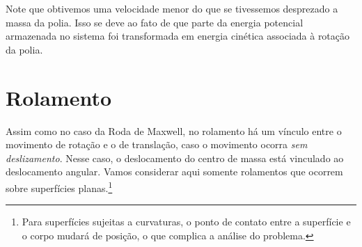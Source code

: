 Note que obtivemos uma velocidade menor do que se tivessemos desprezado a massa da polia. Isso se deve ao fato de que parte da energia potencial armazenada no sistema foi transformada em energia cinética associada à rotação da polia.


\section{Rolamento}

Assim como no caso da Roda de Maxwell, no rolamento há um vínculo entre o movimento de rotação e o de translação, caso o movimento ocorra \emph{sem deslizamento}. Nesse caso, o deslocamento do centro de massa está vinculado ao deslocamento angular. Vamos considerar aqui somente rolamentos que ocorrem sobre superfícies planas.\footnote[][-3cm]{Para superfícies sujeitas a curvaturas, o ponto de contato entre a superfície e o corpo mudará de posição, o que complica a análise do problema.}

